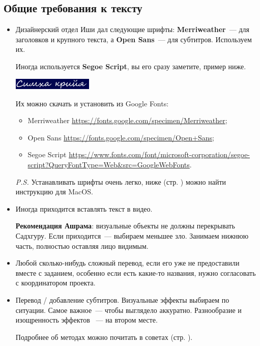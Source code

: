 \documentclass[
a4paper, %
12pt, %
article,
onecolumn, %
openany, %
]{memoir}
\begin{document}
\subsection{Общие требования к тексту}
\begin{itemize}
\item Дизайнерский отдел Иши дал следующие шрифты: 
    \textbf{Merriweather}~--- для заголовков и крупного текста, а 
    \textbf{Open Sans}~--- для субтитров. Используем их.

    Иногда используется \textbf{Segoe Script}, вы его сразу заметите, пример ниже.

    \includegraphics[width=0.3\textwidth]{segoeScript}

    Их можно скачать и установить из Google Fonts:
    \begin{itemize}
        \item  Merriweather \href{https://fonts.google.com/specimen/Merriweather}{\small https://fonts.google.com/specimen/Merriweather};
        \item Open Sans \href{https://fonts.google.com/specimen/Open+Sans}{\small https://fonts.google.com/specimen/Open+Sans};
    \item Segoe Script \href{https://www.fonts.com/font/microsoft-corporation/segoe-script?QueryFontType=Web&src=GoogleWebFonts}{\small https://www.fonts.com/font/microsoft-corporation/segoe-script?QueryFontType=Web\&src=GoogleWebFonts}.
    \end{itemize}

    \emph{P.S.} Устанавливать шрифты очень легко, 
    ниже (стр. \pageref{fonts}) можно найти инструкцию для MacOS.

\item Иногда приходится вставлять текст в видео. 

    \textbf{Рекомендация Ашрама}: визуальные объекты не должны перекрывать 
     Садхгуру. Если приходится~--- выбираем меньшее зло. Занимаем нижнюю часть, 
     полностью оставляя лицо видимым.

\item Любой сколько-нибудь сложный перевод, 
    {\color{gray} если его уже не предоставили вместе с заданием},
    особенно если есть какие-то названия, нужно согласовать 
    с координатором проекта.

\item Перевод / добавление субтитров. Визуальные эффекты выбираем по ситуации. 
    Самое важное~--- чтобы выглядело аккуратно. Разнообразие и изощренность 
    эффектов ~--- на втором месте. 

    Подробнее об методах можно почитать в советах (стр. \pageref{advices}).  
\end{itemize}
\end{document}
